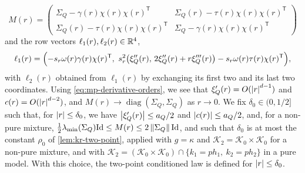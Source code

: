 \begin{equation}\label{eq:mp-M}
M(r)=\begin{pmatrix}\Sigma_Q-\gamma(r)\chi(r)\chi(r)^{\mathsf T}&\Sigma_Q(r)-\tau(r)\chi(r)\chi(r)^{\mathsf T}\\ \Sigma_Q(r)-\tau(r)\chi(r)\chi(r)^{\mathsf T}&\Sigma_Q-\gamma(r)\chi(r)\chi(r)^{\mathsf T}\end{pmatrix}
\end{equation}
and the row vectors $\ell_1(r),\ell_2(r)\in\mathbb R^4$,
\begin{equation}\label{eq:mp-ell}
\ell_1(r)=\Bigl(-s_r\omega(r)\gamma(r)\chi(r)^{\mathsf T},\ s_r^2\bigl(\xi_Q''(r),\,2\xi_Q''(r)+r\xi_Q'''(r)\bigr)-s_r\omega(r)\tau(r)\chi(r)^{\mathsf T}\Bigr),
\end{equation}
with $\ell_2(r)$ obtained from $\ell_1(r)$ by exchanging its first two and its last two coordinates. Using \eqref{eq:mp-derivative-orders}, we see that $\xi_Q'(r)=O(\left|r\right|^{d-1})$ and $c(r)=O(\left|r\right|^{d-2})$, and $M(r)\to\operatorname{diag}(\Sigma_Q,\Sigma_Q)$ as $r\to0$. We fix $\delta_0\in(0,1/2]$ such that, for $\left|r\right|\le\delta_0$, we have $\left|\xi_Q'(r)\right|\le a_Q/2$ and $\left|c(r)\right|\le a_Q/2$, and, for a non-pure mixture, $\frac12\lambda_{\min}(\Sigma_Q)\mathrm{Id}\le M(r)\le2\left\lVert\Sigma_Q\right\rVert\mathrm{Id}$, and such that $\delta_0$ is at most the constant $\rho_0$ of \cref{lem:kr-two-point}, applied with $g=\kappa$ and $\mathcal K_2=\mathcal K_0\times\mathcal K_0$ for a non-pure mixture, and with $\mathcal K_2=(\mathcal K_0\times\mathcal K_0)\cap\{k_1=ph_1,\ k_2=ph_2\}$ in a pure model. With this choice, the two-point conditioned law is defined for $\left|r\right|\le\delta_0$.

